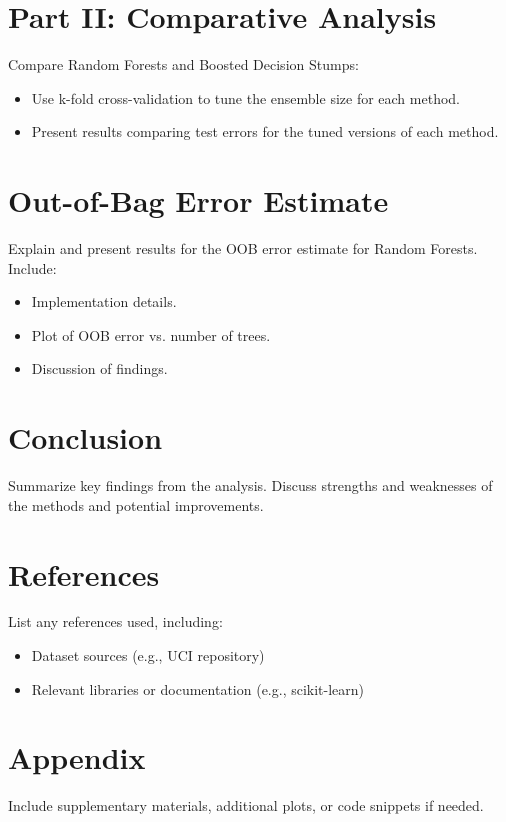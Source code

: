 \documentclass[12pt]{article}
\begin{document}
\section{Part II: Comparative Analysis}
Compare Random Forests and Boosted Decision Stumps:
\begin{itemize}
    \item Use k-fold cross-validation to tune the ensemble size for each method.
    \item Present results comparing test errors for the tuned versions of each method.
\end{itemize}

\newpage
\section{Out-of-Bag Error Estimate}
Explain and present results for the OOB error estimate for Random Forests. Include:
\begin{itemize}
    \item Implementation details.
    \item Plot of OOB error vs. number of trees.
    \item Discussion of findings.
\end{itemize}

\section{Conclusion}
Summarize key findings from the analysis. Discuss strengths and weaknesses of the methods and potential improvements.

\section{References}
List any references used, including:
\begin{itemize}
    \item Dataset sources (e.g., UCI repository)
    \item Relevant libraries or documentation (e.g., scikit-learn)
\end{itemize}

\appendix
\section{Appendix}
Include supplementary materials, additional plots, or code snippets if needed.
\end{document}
